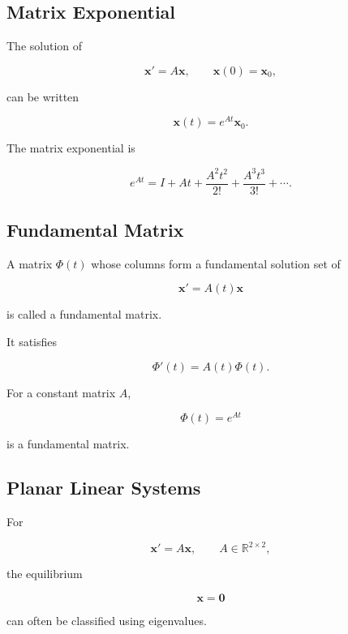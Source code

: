 \subsection{Matrix Exponential}
\label{subsec:matrix-exponential-ode}

The solution of

\[
\mathbf{x}'
=
A\mathbf{x},
\qquad
\mathbf{x}(0)=\mathbf{x}_0,
\]

can be written

\[
\boxed{
\mathbf{x}(t)
=
e^{At}
\mathbf{x}_0.
}
\]

The matrix exponential is

\[
\boxed{
e^{At}
=
I
+
At
+
\frac{
A^2t^2
}{
2!
}
+
\frac{
A^3t^3
}{
3!
}
+
\cdots.
}
\]

\subsection{Fundamental Matrix}
\label{subsec:fundamental-matrix-ode}

A matrix \(\Phi(t)\) whose columns form a fundamental solution set of

\[
\mathbf{x}'
=
A(t)\mathbf{x}
\]

is called a fundamental matrix.

It satisfies

\[
\boxed{
\Phi'(t)
=
A(t)\Phi(t).
}
\]

For a constant matrix \(A\),

\[
\boxed{
\Phi(t)=e^{At}
}
\]

is a fundamental matrix.

\subsection{Planar Linear Systems}
\label{subsec:planar-linear-systems}

For

\[
\boxed{
\mathbf{x}'
=
A\mathbf{x},
\qquad
A\in\mathbb{R}^{2\times2},
}
\]

the equilibrium

\[
\mathbf{x}=\mathbf{0}
\]

can often be classified using eigenvalues.

